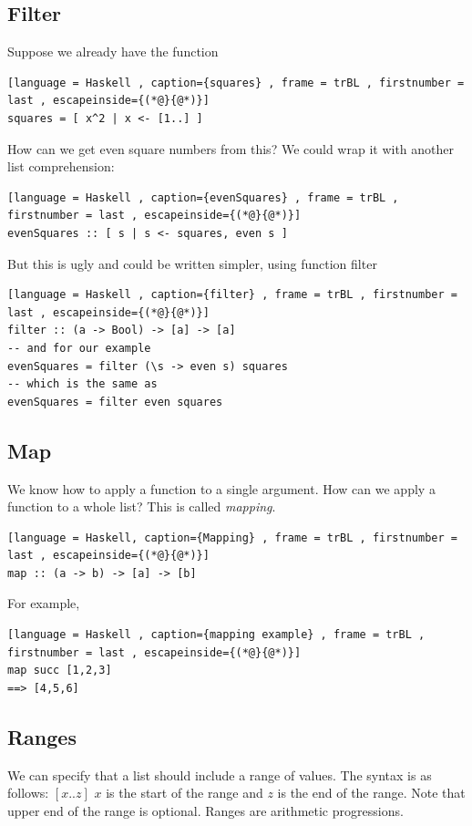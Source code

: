 \documentclass[a4paper]{article}
\theoremstyle{plain}
\theoremstyle{definition}
\theoremstyle{remark}
\begin{document}
\subsection{Filter}
Suppose we already have the function
\begin{lstlisting}[language = Haskell , caption={squares} , frame = trBL , firstnumber = last , escapeinside={(*@}{@*)}]
squares = [ x^2 | x <- [1..] ]
\end{lstlisting}
How can we get even square numbers from this? We could wrap it with another list comprehension:
\begin{lstlisting}[language = Haskell , caption={evenSquares} , frame = trBL , firstnumber = last , escapeinside={(*@}{@*)}]
evenSquares :: [ s | s <- squares, even s ]
\end{lstlisting}
But this is ugly and could be written simpler, using function filter
\begin{lstlisting}[language = Haskell , caption={filter} , frame = trBL , firstnumber = last , escapeinside={(*@}{@*)}]
filter :: (a -> Bool) -> [a] -> [a]
-- and for our example
evenSquares = filter (\s -> even s) squares
-- which is the same as
evenSquares = filter even squares
\end{lstlisting}
\subsection{Map}

We know how to apply a function to a single argument. How can we apply a function to a whole list? This is called \textit{mapping}. 
\begin{lstlisting}[language = Haskell, caption={Mapping} , frame = trBL , firstnumber = last , escapeinside={(*@}{@*)}]
map :: (a -> b) -> [a] -> [b]
\end{lstlisting}
For example,
\begin{lstlisting}[language = Haskell , caption={mapping example} , frame = trBL , firstnumber = last , escapeinside={(*@}{@*)}]
map succ [1,2,3]
==> [4,5,6]
\end{lstlisting}
\subsection{Ranges}
We can specify that a list should include a range of values. The syntax is as follows: $[x..z]$ $x$ is the start of the range and $z$ is the end of the range. Note that upper end of the range is optional. Ranges are arithmetic progressions. 
\end{document}
